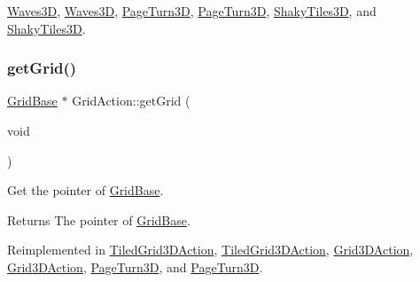 \hyperlink{classWaves3D_a7f9f49bce0ebd46fc200d208a984b5bf}{Waves3D}, \hyperlink{classWaves3D_ab41b6156741e145fbd6c3626bc16ec25}{Waves3D}, \hyperlink{classPageTurn3D_a4679e461471010cd87932c11be5bef9a}{Page\+Turn3D}, \hyperlink{classPageTurn3D_a98aa1300a97553c4f4185d974021bdc4}{Page\+Turn3D}, \hyperlink{classShakyTiles3D_aefe37a5cda9d6898ad9c573e5a220ce1}{Shaky\+Tiles3D}, and \hyperlink{classShakyTiles3D_ad83d154be5494000eb8fcfe657e503ff}{Shaky\+Tiles3D}.

\mbox{\label{classGridAction_abb96dc546ce69541bd233b7c2f240add}} 
\subsubsection{\texorpdfstring{get\+Grid()}{getGrid()}\hspace{0.1cm}{\footnotesize\ttfamily [1/2]}}
{\footnotesize\ttfamily \hyperlink{classGridBase}{Grid\+Base} $\ast$ Grid\+Action\+::get\+Grid (\begin{DoxyParamCaption}\item[{void}]{ }\end{DoxyParamCaption})\hspace{0.3cm}{\ttfamily [virtual]}}



Get the pointer of \hyperlink{classGridBase}{Grid\+Base}. 

\begin{DoxyReturn}{Returns}
The pointer of \hyperlink{classGridBase}{Grid\+Base}. 
\end{DoxyReturn}


Reimplemented in \hyperlink{classTiledGrid3DAction_a6a959d99477286fe1c467560638f1321}{Tiled\+Grid3\+D\+Action}, \hyperlink{classTiledGrid3DAction_a6481f8c3be55a8edc01527a7d62e9fce}{Tiled\+Grid3\+D\+Action}, \hyperlink{classGrid3DAction_a9b03fb743c9ba963d361b87ce975a642}{Grid3\+D\+Action}, \hyperlink{classGrid3DAction_ad68b52ba318636b43a4c7aab0a9c2887}{Grid3\+D\+Action}, \hyperlink{classPageTurn3D_a69c44c157a7652d2a183dba481bce69a}{Page\+Turn3D}, and \hyperlink{classPageTurn3D_a7b3315a39780438de87cbaa2c9c52c9c}{Page\+Turn3D}.

\mbox{\label{classGridAction_a0c0b1f2190d1996c7ecef7a1f51cc869}} 
